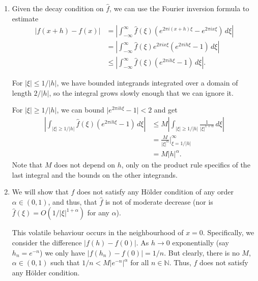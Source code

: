 \documentclass[12 pt, letterpaper]{hmcpset}
\begin{document}
\begin{solution}
	\begin{enumerate}
		\item Given the decay condition on $\hat{f}$, we can use the Fourier inversion formula to estimate
			\begin{align*}
				\lvert f(x + h) - f(x) \rvert & = \left \lvert \int_{-\infty}^{\infty} \hat{f}(\xi) (e^{2 \pi i (x + h) \xi} - e^{2 \pi i x \xi}) \, d\xi  \right \rvert \\
							      & = \left \lvert \int_{-\infty}^{\infty} \hat{f}(\xi) e^{2 \pi i x \xi} (e^{2 \pi i h \xi} - 1) \, d\xi  \right \rvert \\
							      & \le \left \lvert \int_{-\infty}^{\infty} \hat{f}(\xi) (e^{2 \pi i h \xi} - 1) \, d\xi  \right \rvert.
			\end{align*}

			For $\lvert \xi \rvert \le 1/\lvert h \rvert$, we have bounded integrands integrated over a domain of length $2/\lvert h \rvert$, so the integral grows slowly enough that we can ignore it.

			For $\lvert \xi \rvert \ge 1/\lvert h \rvert$, we can bound $\lvert e^{2 \pi i h \xi} - 1 \rvert < 2$ and get
			\begin{align*}
				\left \lvert \int_{\lvert \xi \rvert \ge 1/\lvert h \rvert} \hat{f}(\xi) (e^{2 \pi i h \xi} - 1) \, d\xi \right \rvert & \le M \left \lvert \int_{\lvert \xi \rvert \ge 1/\lvert h \rvert} \frac{1}{\lvert \xi \rvert^{1 + \alpha}} \, d\xi  \right \rvert \\
				& = \frac{M}{\lvert \xi \rvert^{\alpha}} \Big |_{\xi = 1/\lvert h \rvert}^{\infty} \\
				& = M \lvert h \rvert^{\alpha}.
			\end{align*}
			Note that $M$ does not depend on $h$, only on the product rule specifics of the last integral and the bounds on the other integrands.

		\item We will show that $f$ does not satisfy any H\"older condition of any order $\alpha \in (0, 1)$, and thus, that $\hat{f}$ is not of moderate decrease (nor is $\hat{f}(\xi) = O(1 / \lvert \xi \rvert^{1 + \alpha})$ for any $\alpha$). 

			This volatile behaviour occurs in the neighbourhood of $x = 0$. Specifically, we consider the difference $\lvert f(h) - f(0) \rvert$. As $h \to 0$ exponentially (say $h_{n} = e^{-n}$) we only have $\lvert f(h_{n}) - f(0) \rvert = 1/n$. But clearly, there is no $M$, $\alpha \in (0, 1)$ such that $1/n < M \lvert e^{-n} \rvert^{\alpha}$ for all $n \in \mathbb{N}$. Thus, $f$ does not satisfy any H\"older condition.
	\end{enumerate}
\end{solution}
\end{document}

